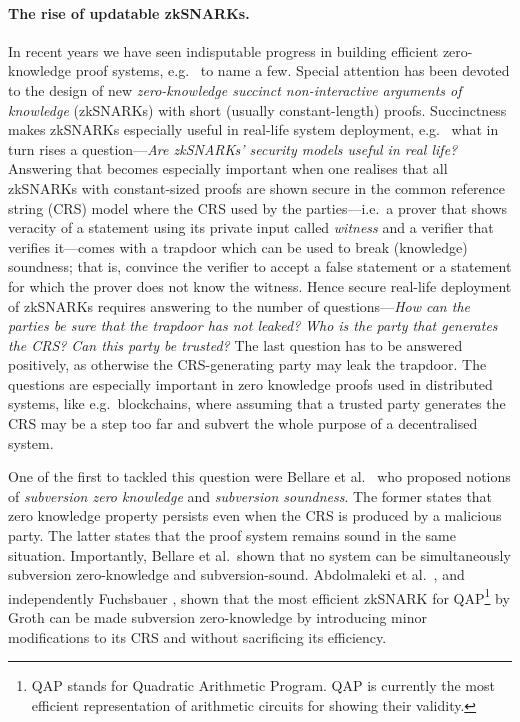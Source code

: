 \let\accentvec\vec \documentclass[runningheads]{llncs}
\begin{document}
\paragraph{The rise of updatable
zkSNARKs.} 
In recent years we have seen indisputable progress in building efficient
zero-knowledge proof systems,
e.g.~\cite{AC:Groth10a,TCC:Lipmaa12,EC:GGPR13,SP:PHGR13,AC:Lipmaa13,AC:DFGK14,EC:Groth16,SP:BBBPWM18}
to name a few. Special attention has been devoted to the design of new
\emph{zero-knowledge succinct non-interactive arguments of knowledge} (zkSNARKs)
with short (usually constant-length) proofs. Succinctness makes zkSNARKs
especially useful in real-life system deployment,
e.g.~\cite{REPO:Zcash20,ARXIV:RonZaj19,REPO:Zeth20,REPO:Celo20,REPO:Aztec20}
what in turn rises a question---\emph{Are zkSNARKs' security models useful in
  real life?} Answering that becomes especially important when one realises that
all zkSNARKs with constant-sized proofs are shown secure in the common reference
string (CRS) model where the CRS used by the parties---i.e.~a prover that shows
veracity of a statement using its private input called \emph{witness} and a
verifier that verifies it---comes with a trapdoor which can be used to break
(knowledge) soundness; that is, convince the verifier to accept a false
statement or a statement for which the prover does not know the witness. Hence
 secure real-life deployment of zkSNARKs requires answering to the number of
questions---\emph{How can the parties be sure that the trapdoor has not leaked?}
\emph{Who is the party that generates the CRS?} \emph{Can this party be
  trusted?} The last question has to be answered positively, as otherwise the
CRS-generating party may leak the trapdoor. The questions are especially
important in zero knowledge proofs used in distributed systems, like
e.g.~blockchains, where assuming that a trusted party generates the CRS may be a
step too far and subvert the whole purpose of a decentralised system.

One of the first to tackled this question were Bellare et al.~\cite{AC:BelFucSca16} who
proposed notions of \emph{subversion zero knowledge} and \emph{subversion
soundness}. The former states that zero knowledge property persists even when
the CRS is produced by a malicious party. The latter states that the proof
system remains sound in the same situation. Importantly, Bellare et al.~shown
that no system can be simultaneously subversion zero-knowledge and subversion-sound.
Abdolmaleki et al.~\cite{AC:ABLZ17}, and independently Fuchsbauer
\cite{PKC:Fuchsbauer18}, shown that the most
efficient zkSNARK for QAP\footnote{QAP stands for Quadratic Arithmetic
Program. QAP is currently the most efficient representation of arithmetic
circuits for showing their validity.} by Groth \cite{EC:Groth16} can be made
subversion zero-knowledge by introducing minor modifications to its CRS and without
sacrificing its efficiency. 
\end{document}
